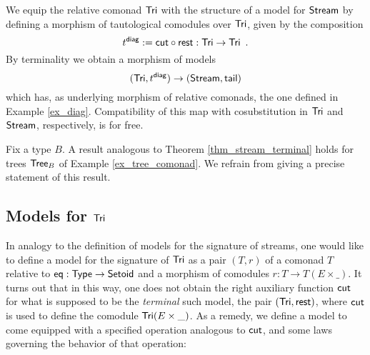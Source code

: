 \documentclass[a4paper,USenglish]{lipics}
\begin{document}
\begin{example}\label{ex_diag_terminal}
  We equip the relative comonad $\mathsf{Tri}$ with the structure of a model for $\mathsf{Stream}$ by defining a 
  morphism of tautological comodules over $\mathsf{Tri}$, given by the composition
   \[ t^{\mathsf{diag}} := {\mathsf{cut}} \circ {\ensuremath{\mathsf{rest}}}  : \mathsf{Tri} \to \mathsf{Tri} \enspace . \]
  By terminality we obtain a morphism of models
   \[(\mathsf{Tri}, t^{\mathsf{diag}}) \to (\mathsf{Stream}, \mathsf{tail}) \] 
  which has, as underlying morphism of relative comonads, the one defined in Example \ref{ex_diag}. 
  Compatibility of this map with cosubstitution in $\mathsf{Tri}$ and $\mathsf{Stream}$, respectively,
  is for free.
\end{example}

 
\begin{rem}
 Fix a type $B$. A result analogous to Theorem \ref{thm_stream_terminal} holds for trees $\mathsf{Tree}_B$ of Example \ref{ex_tree_comonad}. 
 We refrain from giving a precise statement of this result.
\end{rem}


\subsection{Models for \texorpdfstring{$\mathsf{Tri}$}{Tri}}

In analogy to the definition of models for the signature of streams, one would like to define
a model for the signature of $\mathsf{Tri}$ as a pair $(T,r)$ of a comonad $T$ relative to $\mathsf{eq} : \mathsf{Type} \to \mathsf{Setoid}$ and 
a morphism of comodules $r : T \to T(E\times \_)$. 
It turns out that in this way, one does not obtain the right auxiliary function $\mathsf{cut}$ for what is
supposed to be the \emph{terminal} such model, the pair $(\mathsf{Tri},\mathsf{rest})$, where $\mathsf{cut}$ is used to define the comodule $\mathsf{Tri}(E\times \_)$.
As a remedy, we define a model to come equipped with a specified operation analogous to $\mathsf{cut}$, and some laws governing
the behavior of that operation:
\end{document}
